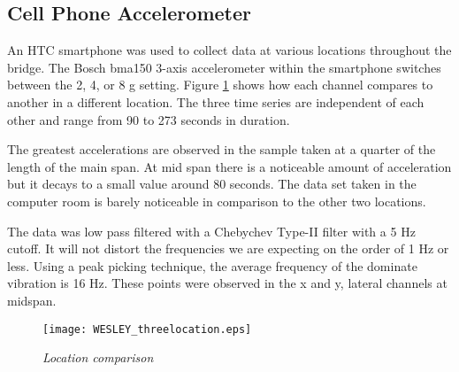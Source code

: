 \subsection{Cell Phone Accelerometer}

An HTC smartphone was used to collect data at various locations throughout the bridge. The Bosch bma150 3-axis accelerometer within the smartphone switches between the 2, 4, or 8 g setting. Figure \ref{fig:threeloc} shows how each channel compares to another in a different location. The three time series are independent of each other and range from 90 to 273 seconds in duration. 

\indent The greatest accelerations are observed in the sample taken at a quarter of the length of the main span. At mid span there is a noticeable amount of acceleration but it decays to a small value around 80 seconds. The data set taken in the computer room is barely noticeable in comparison to the other two locations.

\indent The data was low pass filtered with a Chebychev Type-II filter with a 5 Hz cutoff. It will not distort the frequencies we are expecting on the order of 1 Hz or less. Using a peak picking technique, the average frequency of the dominate vibration is 16 Hz. These points were observed in the x and y, lateral channels at midspan. 

\begin{landscape}
\begin{figure}
\centering
\texttt{[image: WESLEY\_threelocation.eps]}
\caption{\textit{Location comparison}}
\label{fig:threeloc}
\end{figure}
\end{landscape}